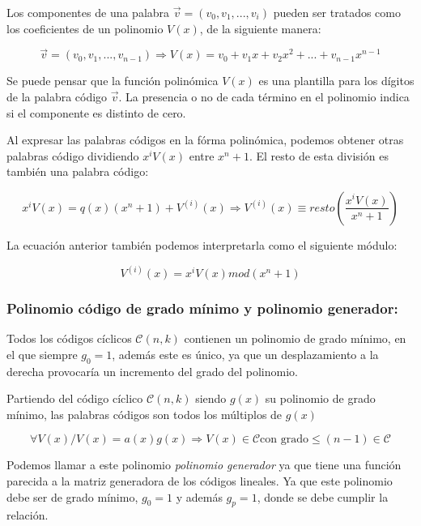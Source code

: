 \documentclass{article}
\begin{document}
Los componentes de una palabra $\vec{v} = (v_0, v_1, ..., v_i)$ pueden ser tratados como los coeficientes de un polinomio $V(x)$, de la siguiente manera:

\begin{equation}
    \vec{v} = (v_0, v_1, ..., v_{n-1}) \Rightarrow V(x) = v_0 + v_1x + v_2x^2+...+v_{n-1}x^{n-1}
\end{equation}

Se puede pensar que la función polinómica $V(x)$ es una plantilla para los dígitos de la palabra código $\vec{v}$. La presencia o no de cada término en el polinomio indica si el componente es distinto de cero.

Al expresar las palabras códigos en la fórma polinómica, podemos obtener otras palabras código dividiendo $x^iV(x)$ entre $x^n+1$. El resto de esta división es también una palabra código:

\begin{equation}
    x^iV(x) = q(x)(x^n+1)+V^{(i)}(x) \Rightarrow V^{(i)}(x) \equiv resto \left(\frac{x^iV(x)}{x^n+1}\right)
\end{equation}

La ecuación anterior también podemos interpretarla como el siguiente módulo:

\begin{equation}
    V^{(i)}(x) = x^iV(x)mod{(x^n+1)}
\end{equation}

\pagebreak

\subsubsection{Polinomio código de grado mínimo y polinomio generador:}

Todos los códigos cíclicos $\mathcal{C}(n,k)$ contienen un polinomio de grado mínimo, en el que siempre $g_0 = 1$, además este es único, ya que un desplazamiento a la derecha provocaría un incremento del grado del polinomio.

Partiendo del código cíclico $\mathcal{C}(n,k)$ siendo $g(x)$ su polinomio de grado mínimo, las palabras códigos son todos los múltiplos de $g(x)$

\begin{equation}
    \forall V(x) / V(x) = a(x)g(x) \Rightarrow V(x) \in \mathcal{C} \text{con grado} \leq(n-1)\in\mathcal{C}
\end{equation}

Podemos llamar a este polinomio \textit{polinomio generador} ya que tiene una función parecida a la matriz generadora de los códigos lineales. Ya que este polinomio debe ser de grado mínimo, $g_0  = 1$ y además $g_p = 1$, donde se debe cumplir la relación.
\end{document}
